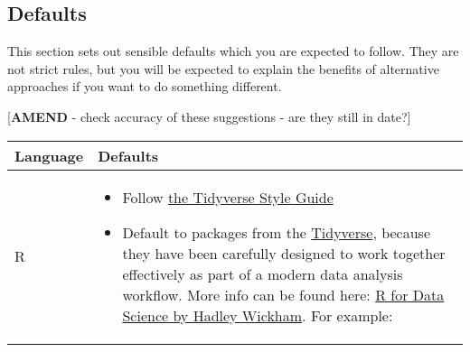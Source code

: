 \documentclass[]{book}
\providecommand{\tightlist}{%
  \setlength{\itemsep}{0pt}\setlength{\parskip}{0pt}}
\begin{document}
\hypertarget{defaults}{%
\subsection*{Defaults}\label{defaults}}

This section sets out sensible defaults which you are expected to follow. They are not strict rules, but you will be expected to explain the benefits of alternative approaches if you want to do something different.

{[}\textbf{AMEND} - check accuracy of these suggestions - are they still in date?{]}

\begin{longtable}[]{@{}ll@{}}
\toprule
\begin{minipage}[b]{0.27\columnwidth}\raggedright
Language\strut
\end{minipage} & \begin{minipage}[b]{0.67\columnwidth}\raggedright
Defaults\strut
\end{minipage}\tabularnewline
\midrule
\endhead
\begin{minipage}[t]{0.27\columnwidth}\raggedright
R\strut
\end{minipage} & \begin{minipage}[t]{0.67\columnwidth}\raggedright
\begin{itemize}
\tightlist
\item
  Follow \href{https://style.tidyverse.org/index.html}{the Tidyverse Style Guide}
\item
  Default to packages from the \href{http://tidyverse.org/}{Tidyverse}, because they have been carefully designed to work together effectively as part of a modern data analysis workflow. More info can be found here: \href{http://r4ds.had.co.nz}{R for Data Science by Hadley Wickham}. For example:


\end{itemize}
\end{minipage}
\end{longtable}
\end{document}
